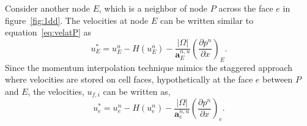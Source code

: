 Consider another node $E$, which is a neighbor of node $P$ across the face $e$ in figure~\ref{fig:1dd}. The velocities at node $E$ can be written similar to equation~\ref{eq:velatP} as
\begin{equation}
u_{E}^{\ast} = u_{E}^n - H(u^n_E) -  \frac{|\Omega|}{\mathbf{a}_{E}^{n,u}}\left(\frac{\partial p^n}{\partial x}\right)_{E} .
\label{eq:velatE}
\end{equation}
Since the momentum interpolation technique mimics the staggered approach where velocities are stored on cell faces, hypothetically at the face $e$ between $P$ and $E$, the velocities, $u_{f,i}$ can be written as,
\begin{equation}
u_{e}^{\ast} = u_{e}^n - H(u^n_e) -  \frac{|\Omega|}{\mathbf{a}_{e}^{n,u}}\left(\frac{\partial p^n}{\partial x}\right)_{e} .
\label{eq:velatf}
\end{equation}

